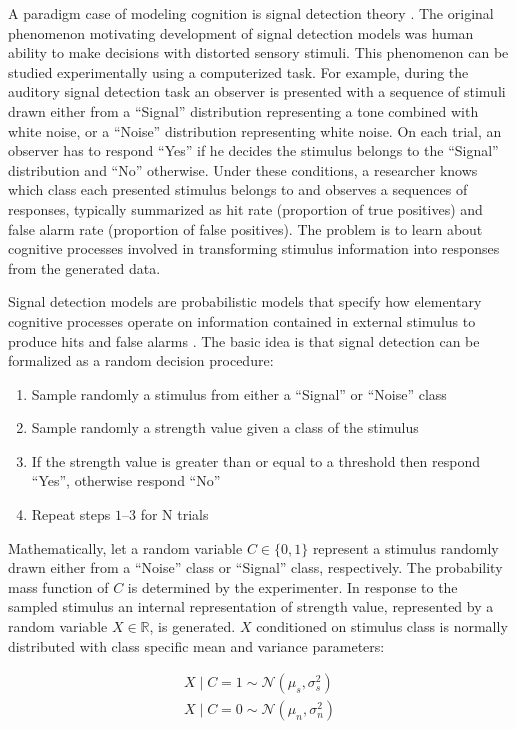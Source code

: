 \documentclass[12pt]{article}
\begin{document}
	A paradigm case of modeling cognition is signal detection theory \citep{MacCre2004}. The original phenomenon motivating development of signal detection models was human ability to make decisions with distorted sensory stimuli. This phenomenon can be studied experimentally using a computerized task. For example, during the auditory signal detection task an observer is presented with a sequence of stimuli drawn either from a “Signal” distribution representing a tone combined with white noise, or a “Noise” distribution representing white noise. On each trial, an observer has to respond “Yes” if he decides the stimulus belongs to the “Signal” distribution and “No” otherwise. Under these conditions, a researcher knows which class each presented stimulus belongs to and observes a sequences of responses, typically summarized as hit rate (proportion of true positives) and false alarm rate (proportion of false positives). The problem is to learn about cognitive processes involved in transforming stimulus information into responses from the generated data.
    
	Signal detection models are probabilistic models that specify how elementary cognitive processes operate on information contained in external stimulus to produce hits and false alarms \citep{MacCre2004,LeeWag2014}. The basic idea is that signal detection can be formalized as a random decision procedure:
    
\begin{enumerate}
\item Sample randomly a stimulus from either a “Signal” or “Noise” class
\item Sample randomly a strength value given a class of the stimulus
\item If the strength value is greater than or equal to a threshold then respond “Yes”, otherwise respond “No”
\item Repeat steps $1$--$3$ for N trials
\end{enumerate}
Mathematically, let a random variable $C \in \{0, 1\}$  represent a stimulus randomly drawn either from a “Noise” class or “Signal” class, respectively. The probability mass function of $C$ is determined by the experimenter. In response to the sampled stimulus an internal representation of strength value, represented by a random variable $X \in \mathbb{R}$, is generated. $X$ conditioned on stimulus class is normally distributed with class specific mean and variance parameters: 

\begin{align}\nonumber
X \mid C = 1 \sim \mathcal{N}(\mu_s, \sigma_s^2)\\
X \mid C = 0 \sim \mathcal{N}(\mu_n, \sigma_n^2)
\end{align}
\end{document}
